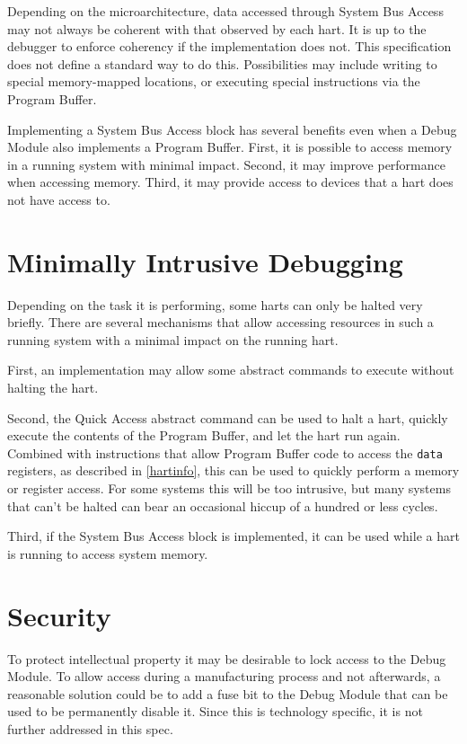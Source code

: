 Depending on the microarchitecture, data accessed through System Bus Access may
not always be coherent with that observed by each hart. It is up to the
debugger to enforce coherency if the implementation does not. This
specification does not define a standard way to do this.
Possibilities may include
writing to special memory-mapped
locations, or executing special instructions via the Program Buffer.

\begin{commentary}
Implementing a System Bus Access block has several benefits even
when a Debug Module also implements a Program Buffer.
First, it is possible to
access memory in a running system with minimal impact.  Second, it may improve
performance when accessing memory.
Third, it may provide
access to devices that a hart does not have access to.
\end{commentary}

\section{Minimally Intrusive Debugging}

Depending on the task it is performing, some harts can only be halted very briefly.
There are several mechanisms that allow accessing resources in such a running system
with a minimal impact on the running hart.

First, an implementation may allow some abstract commands to execute without halting the hart.

Second, the Quick Access abstract command can be used to halt a hart, quickly
execute the contents of the Program Buffer, and let the hart run again.
Combined with instructions that allow Program Buffer code to access the
{\tt data} registers, as described in \ref{hartinfo}, this can be used to quickly
perform a memory or register access. For some systems this will be too
intrusive, but many systems that can't be halted can bear an occasional hiccup
of a hundred or less cycles.

Third, if the System Bus Access block is implemented, it can be used while a
hart is running to access system memory.

\section{Security}

To protect intellectual property it may be desirable to lock access to the
Debug Module.  To allow access during a manufacturing process and not
afterwards, a reasonable solution could be to add a fuse bit to the Debug
Module that can be used to be permanently disable it. Since this is technology
specific, it is not further addressed in this spec.

